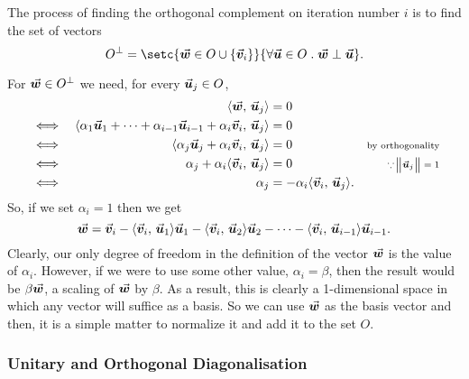 \documentclass[../MathsNotesBase.tex]{subfiles}
\begin{document}
{		
		\medskip
		The process of finding the orthogonal complement on iteration number $i$ is to find the set of vectors
		\[ O^\perp = \setc{\w \in O \cup \{\v_i\}}{\forall \u \in O \logicsep \w \perp \u}. \]
		
		For ${ \vec{\bm{w}} \in O^\perp }$ we need, for every ${ \vec{\bm{u}}_j \in O }$,
		\[\begin{aligned}
			&& \langle \vec{\bm{w}},\, \vec{\bm{u}}_j \rangle &= 0 \\
			&\iff & \langle \alpha_1 \vec{\bm{u}}_1 + \cdots + \alpha_{i-1} \vec{\bm{u}}_{i-1} + \alpha_i \vec{\bm{v}}_i,\, \vec{\bm{u}}_j \rangle &= 0 \\
			&\iff & \langle \alpha_j \vec{\bm{u}}_j + \alpha_i \vec{\bm{v}}_i,\, \vec{\bm{u}}_j \rangle &= 0 &\text{\scriptsize{by orthogonality}} \\
			&\iff & \alpha_j + \alpha_i \langle \vec{\bm{v}}_i,\, \vec{\bm{u}}_j \rangle  &= 0 &\text{\scriptsize{${ \because \norm{\vec{\bm{u}}_j} = 1 }$}} \\
			&\iff & \alpha_j &= -\alpha_i \langle \vec{\bm{v}}_i,\, \vec{\bm{u}}_j \rangle.
		\end{aligned}\]
		So, if we set ${ \alpha_i = 1 }$ then we get
		\[ \vec{\bm{w}} = \vec{\bm{v}}_i - \langle \vec{\bm{v}}_i,\, \vec{\bm{u}}_1 \rangle\vec{\bm{u}}_1 - \langle \vec{\bm{v}}_i,\, \vec{\bm{u}}_2 \rangle\vec{\bm{u}}_2 - \cdots - \langle \vec{\bm{v}}_i,\, \vec{\bm{u}}_{i-1} \rangle\vec{\bm{u}}_{i-1}. \]
		Clearly, our only degree of freedom in the definition of the vector $\vec{\bm{w}}$ is the value of $\alpha_i$. However, if we were to use some other value, ${ \alpha_i = \beta }$, then the result would be ${ \beta \vec{\bm{w}} }$, a scaling of $\vec{\bm{w}}$ by $\beta$. As a result, this is clearly a 1-dimensional space in which any vector will suffice as a basis. So we can use $\vec{\bm{w}}$ as the basis vector and then, it is a simple matter to normalize it and add it to the set $O$.
		
		
		

		
		
		
		\biggerskip
		\subsubsection{Unitary and Orthogonal Diagonalisation}
		\bigskip
		\label{def:unitary-diagonalisation}
		\label{def:orthogonal-diagonalisation}
		
}
\end{document}
